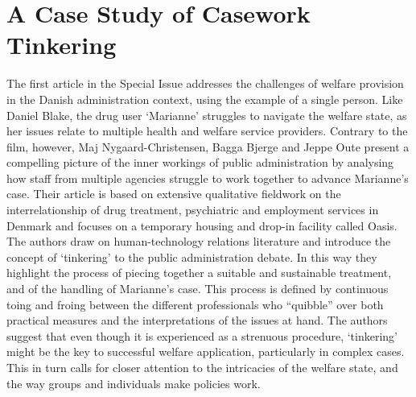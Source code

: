 \section{A Case Study of Casework Tinkering}
The first article in the Special Issue addresses the challenges of welfare provision in the Danish administration context, using the example of a single person. Like Daniel Blake, the drug user ‘Marianne’ struggles to navigate the welfare state, as her issues relate to multiple health and welfare service providers. Contrary to the film, however, Maj Nygaard-Christensen, Bagga Bjerge and Jeppe Oute present a compelling picture of the inner workings of public administration by analysing how staff from multiple agencies struggle to work together to advance Marianne’s case. Their article is based on extensive qualitative fieldwork on the interrelationship of drug treatment, psychiatric and employment services in Denmark and focuses on a temporary housing and drop-in facility called Oasis. The authors draw on human-technology relations literature and introduce the concept of ‘tinkering’ to the public administration debate. In this way they highlight the process of piecing together a suitable and sustainable treatment, and of the handling of Marianne’s case. This process is defined by continuous toing and froing between the different professionals who “quibble” over both practical measures and the interpretations of the issues at hand. The authors suggest that even though it is experienced as a strenuous procedure, ‘tinkering’ might be the key to successful welfare application, particularly in complex cases. This in turn calls for closer attention to the intricacies of the welfare state, and the way groups and individuals make policies work.


